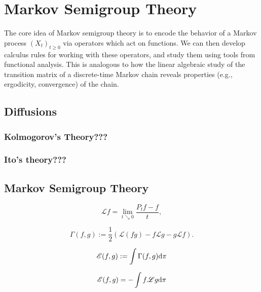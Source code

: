 \chapter{Markov Semigroup Theory}

The core idea of Markov semigroup theory is to encode the behavior of a Markov process $(X_t)_{t\geq 0}$ via operators which act on functions.
We can then develop calculus rules for working with these operators, and study them using tools from functional analysis.
This is analogous to how the linear algebraic study of the transition matrix of a discrete-time Markov chain reveals properties (e.g., ergodicity, convergence) of the chain.

\section{Diffusions}



\subsection{Kolmogorov's Theory???}


\subsection{Ito's theory???}


\section{Markov Semigroup Theory}

\begin{definition}[generator]
    \begin{equation*}
        \mathscr{L}f=\lim_{t\searrow 0}\frac{P_t f-f}{t},
    \end{equation*}
\end{definition}


\begin{definition}
    \begin{equation*}
        \Gamma(f,g):=\frac{1}{2}(\mathscr{L}(fg)-f\mathscr{L}g-g\mathscr{L}f).
    \end{equation*}
\end{definition}

\begin{definition}
    \begin{equation*}
        \mathscr{E}(f,g):=\int \Gamma(f,g)\mathrm{d} \pi
    \end{equation*}

    \begin{equation*}
        \mathscr{E}(f,g)=-\int f\mathscr{L}g\mathrm{d} \pi
    \end{equation*}
\end{definition}

